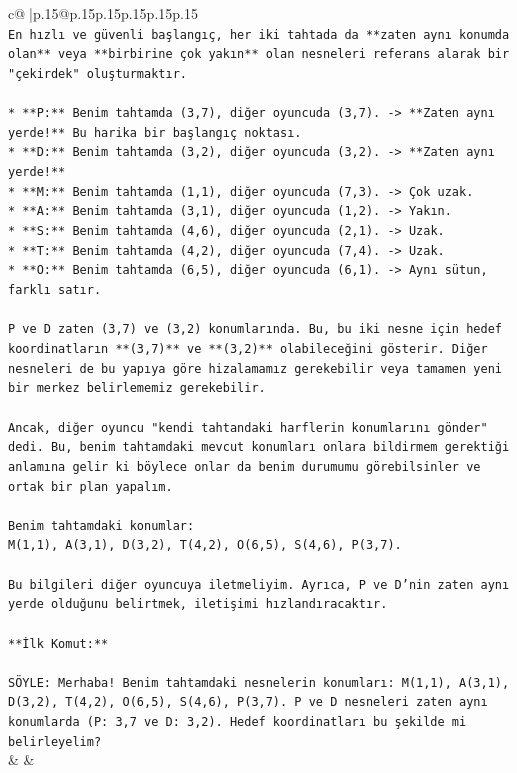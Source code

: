 \documentclass{article}
\begin{document}
{\begin{supertabular}{c@{$\;$}|p{.15\linewidth}@{}p{.15\linewidth}p{.15\linewidth}p{.15\linewidth}p{.15\linewidth}p{.15\linewidth}}
{{{\\ 
\texttt{En hızlı ve güvenli başlangıç, her iki tahtada da **zaten aynı konumda olan** veya **birbirine çok yakın** olan nesneleri referans alarak bir "çekirdek" oluşturmaktır.} \\
\\ 
\texttt{*   **P:** Benim tahtamda (3,7), diğer oyuncuda (3,7). {-}> **Zaten aynı yerde!** Bu harika bir başlangıç noktası.} \\
\texttt{*   **D:** Benim tahtamda (3,2), diğer oyuncuda (3,2). {-}> **Zaten aynı yerde!**} \\
\texttt{*   **M:** Benim tahtamda (1,1), diğer oyuncuda (7,3). {-}> Çok uzak.} \\
\texttt{*   **A:** Benim tahtamda (3,1), diğer oyuncuda (1,2). {-}> Yakın.} \\
\texttt{*   **S:** Benim tahtamda (4,6), diğer oyuncuda (2,1). {-}> Uzak.} \\
\texttt{*   **T:** Benim tahtamda (4,2), diğer oyuncuda (7,4). {-}> Uzak.} \\
\texttt{*   **O:** Benim tahtamda (6,5), diğer oyuncuda (6,1). {-}> Aynı sütun, farklı satır.} \\
\\ 
\texttt{P ve D zaten (3,7) ve (3,2) konumlarında. Bu, bu iki nesne için hedef koordinatların **(3,7)** ve **(3,2)** olabileceğini gösterir. Diğer nesneleri de bu yapıya göre hizalamamız gerekebilir veya tamamen yeni bir merkez belirlememiz gerekebilir.} \\
\\ 
\texttt{Ancak, diğer oyuncu "kendi tahtandaki harflerin konumlarını gönder" dedi. Bu, benim tahtamdaki mevcut konumları onlara bildirmem gerektiği anlamına gelir ki böylece onlar da benim durumumu görebilsinler ve ortak bir plan yapalım.} \\
\\ 
\texttt{Benim tahtamdaki konumlar:} \\
\texttt{M(1,1), A(3,1), D(3,2), T(4,2), O(6,5), S(4,6), P(3,7).} \\
\\ 
\texttt{Bu bilgileri diğer oyuncuya iletmeliyim. Ayrıca, P ve D'nin zaten aynı yerde olduğunu belirtmek, iletişimi hızlandıracaktır.} \\
\\ 
\texttt{**İlk Komut:**} \\
\\ 
\texttt{SÖYLE: Merhaba! Benim tahtamdaki nesnelerin konumları: M(1,1), A(3,1), D(3,2), T(4,2), O(6,5), S(4,6), P(3,7). P ve D nesneleri zaten aynı konumlarda (P: 3,7 ve D: 3,2). Hedef koordinatları bu şekilde mi belirleyelim?} \\
            }
        }
    }
    & & \\ \\


\end{supertabular}}
\end{document}
